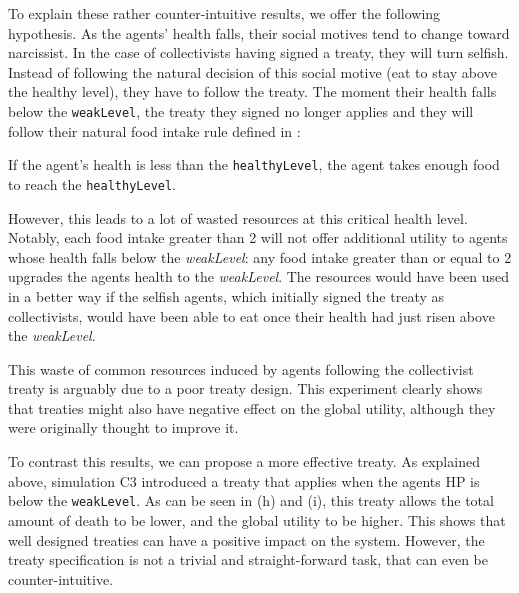 To explain these rather counter-intuitive results, we offer the following hypothesis. As the agents' health falls, their social motives tend to change toward narcissist. In the case of collectivists having signed a treaty, they will turn selfish. Instead of following the natural decision of this social motive (eat to stay above the healthy level), they have to follow the treaty. The moment their health falls below the \texttt{weakLevel}, the treaty they signed no longer applies and they will follow their natural food intake rule defined in :

If the agent's health is less than the \texttt{healthyLevel}, the agent takes enough food to reach the \texttt{healthyLevel}.

However, this leads to a lot of wasted resources at this critical health level. Notably, each food intake greater than 2 will not offer additional utility to agents whose health falls below the \textit{weakLevel}: any food intake greater than or equal to 2 upgrades the agents health to the \textit{weakLevel}. The resources would have been used in a better way if the selfish agents, which initially signed the treaty as collectivists, would have been able to eat once their health had just risen above the \textit{weakLevel}.

This waste of common resources induced by agents following the collectivist treaty is arguably due to a poor treaty design. This experiment clearly shows that treaties might also have negative effect on the global utility, although they were originally thought to improve it.

To contrast this results, we can propose a more effective treaty. As explained above, simulation C3 introduced a treaty that applies when the agents HP is below the \texttt{weakLevel}. As can be seen in  (h) and (i), this treaty allows the total amount of death to be lower, and the global utility to be higher. This shows that well designed treaties can have a positive impact on the system. However, the treaty specification is not a trivial and straight-forward task, that can even be counter-intuitive.


